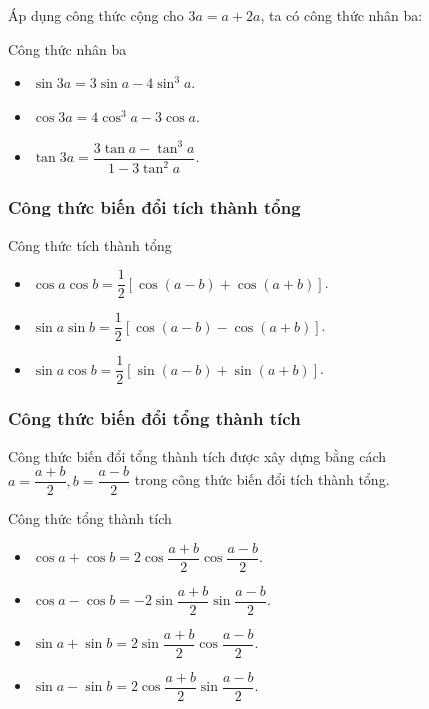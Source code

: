 \begin{note}
	Áp dụng công thức cộng cho $3a = a +2a$, ta có công thức nhân ba:
\end{note}
\begin{khung4}{Công thức nhân ba}
	\begin{multicols}{2}
	\begin{itemize}
		\item $\sin3a= 3\sin a -4\sin^3a$.		
		\item $\cos3a= 4\cos^3a-3\cos a$.
		\item $\tan3a = \dfrac{3\tan a - \tan^3 a}{1-3\tan^2a}$.
	\end{itemize}
\end{multicols}
\end{khung4}

\subsubsection{Công thức biến đổi tích thành tổng}
\begin{khung4}{Công thức tích thành tổng}
	\begin{itemize}
		\item $\cos a \cos b = \dfrac{1}{2}\left[\cos (a-b) + \cos (a+b)\right]$.
		\item $\sin a \sin b = \dfrac{1}{2}\left[\cos (a-b)-\cos(a+b)\right]$.
		\item $\sin a \cos b = \dfrac{1}{2}\left[\sin (a-b)+\sin (a+b)\right]$.
	\end{itemize}
\end{khung4}
\subsubsection{Công thức biến đổi tổng thành tích}
Công thức biến đổi tổng thành tích được xây dựng bằng cách $a=\dfrac{a+b}{2}, b = \dfrac{a-b}{2}$ trong công thức biến đổi tích thành tổng.
\begin{khung4}{Công thức tổng thành tích}
	\begin{multicols}{2}
	\begin{itemize}
		\item $\cos a+ \cos b = 2\cos\dfrac{a+b}{2}\cos \dfrac{a-b}{2}$.
		\item $\cos a- \cos b = -2\sin\dfrac{a+b}{2}\sin \dfrac{a-b}{2}$.
		\item $\sin a+ \sin b = 2\sin\dfrac{a+b}{2}\cos \dfrac{a-b}{2}$.
		\item $\sin a -\sin b = 2\cos\dfrac{a+b}{2}\sin \dfrac{a-b}{2}$.
	\end{itemize}
\end{multicols}
\end{khung4}
\newpage

